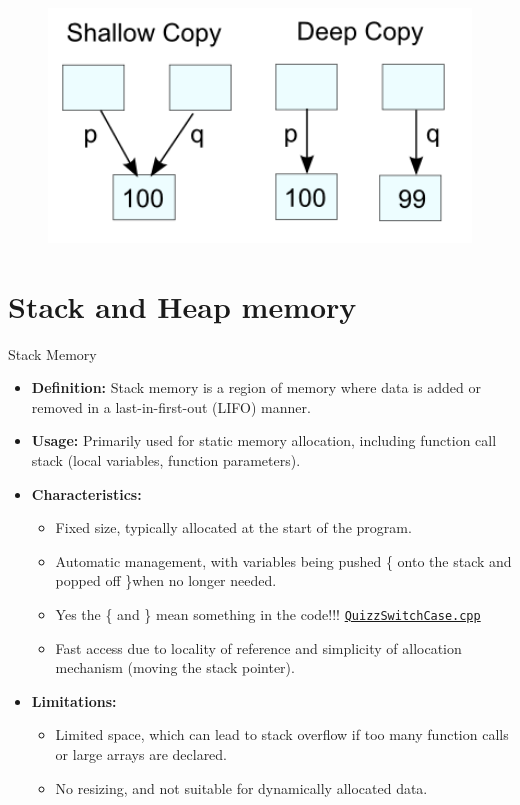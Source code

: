 \documentclass[10pt]{beamer}
\begin{document}
\begin{frame}
  \begin{figure}[h]
    \centering
    \includegraphics[width=1.0\textwidth]{figures/deep_vs_shallow_copy.png}
    \label{fig:MemoryHerarchy}
  \end{figure}
\end{frame}

\section{Stack and Heap memory}
\begin{frame}{Stack Memory}
  \begin{itemize}
    \item \textbf{Definition:} Stack memory is a region of memory where data is added or removed in a last-in-first-out (LIFO) manner.
    \item \textbf{Usage:} Primarily used for static memory allocation, including function call stack (local variables, function parameters).
    \item \textbf{Characteristics:}
      \begin{itemize}
        \item Fixed size, typically allocated at the start of the program.
        \item Automatic management, with variables being pushed \{ onto the stack and popped off \}when no longer needed.
        \item Yes the \{ and \} mean something in the code!!! \href{run:./QuizzSwitchCase.cpp}{\texttt{QuizzSwitchCase.cpp}}
        \item Fast access due to locality of reference and simplicity of allocation mechanism (moving the stack pointer).
      \end{itemize}
    \item \textbf{Limitations:}
      \begin{itemize}
        \item Limited space, which can lead to stack overflow if too many function calls or large arrays are declared.
        \item No resizing, and not suitable for dynamically allocated data.
      \end{itemize}
  \end{itemize}
\end{frame}
\end{document}
